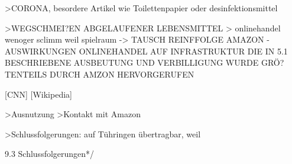 >CORONA, besordere Artikel wie Toilettenpapier oder desinfektionsmittel

>WEGSCHMEI?EN ABGELAUFENER LEBENSMITTEL > onlinehandel wenoger sclimm weil spielraum
-> TAUSCH REINFFOLGE   AMAZON - AUSWIRKUNGEN ONLINEHANDEL AUF INFRASTRUKTUR
DIE IN 5.1 BESCHRIEBENE AUSBEUTUNG UND VERBILLIGUNG WURDE GRÖ?TENTEILS DURCH AMZON HERVORGERUFEN


[CNN]
[Wikipedia]

>Ausnutzung
>Kontakt mit Amazon

>Schlussfolgerungen: auf Tühringen übertragbar, weil 

9.3 Schlussfolgerungen*/